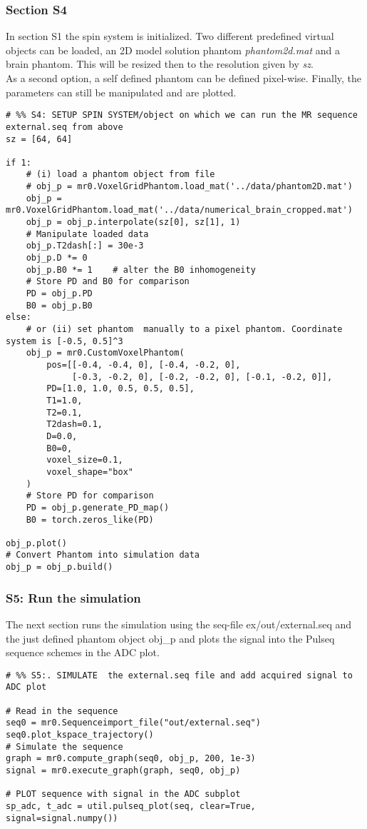 \documentclass[a4paper,12pt]{extarticle}
\begin{document}
\subsubsection{Section S4}
In section S1 the spin system is initialized. Two different predefined virtual objects can be loaded, an 2D model solution phantom \emph{phantom2d.mat} and a brain phantom. This will be resized then to the resolution given by \emph{sz}.  \\
As a second option, a self defined phantom can be defined pixel-wise.
Finally, the parameters can still be manipulated and are plotted.

\begin{verbatim}
# %% S4: SETUP SPIN SYSTEM/object on which we can run the MR sequence external.seq from above
sz = [64, 64]

if 1:
    # (i) load a phantom object from file
    # obj_p = mr0.VoxelGridPhantom.load_mat('../data/phantom2D.mat')
    obj_p = mr0.VoxelGridPhantom.load_mat('../data/numerical_brain_cropped.mat')
    obj_p = obj_p.interpolate(sz[0], sz[1], 1)
    # Manipulate loaded data
    obj_p.T2dash[:] = 30e-3
    obj_p.D *= 0 
    obj_p.B0 *= 1    # alter the B0 inhomogeneity
    # Store PD and B0 for comparison
    PD = obj_p.PD
    B0 = obj_p.B0
else:
    # or (ii) set phantom  manually to a pixel phantom. Coordinate system is [-0.5, 0.5]^3
    obj_p = mr0.CustomVoxelPhantom(
        pos=[[-0.4, -0.4, 0], [-0.4, -0.2, 0],
             [-0.3, -0.2, 0], [-0.2, -0.2, 0], [-0.1, -0.2, 0]],
        PD=[1.0, 1.0, 0.5, 0.5, 0.5],
        T1=1.0,
        T2=0.1,
        T2dash=0.1,
        D=0.0,
        B0=0,
        voxel_size=0.1,
        voxel_shape="box"
    )
    # Store PD for comparison
    PD = obj_p.generate_PD_map()
    B0 = torch.zeros_like(PD)

obj_p.plot()
# Convert Phantom into simulation data
obj_p = obj_p.build()

\end{verbatim}

\subsubsection{S5: Run the simulation}
The next section runs the simulation using the seq-file ex/out/external.seq and  the just defined phantom object obj\_p and plots the signal into the Pulseq sequence schemes in the ADC plot.

\begin{verbatim}
# %% S5:. SIMULATE  the external.seq file and add acquired signal to ADC plot

# Read in the sequence
seq0 = mr0.Sequenceimport_file("out/external.seq")
seq0.plot_kspace_trajectory()
# Simulate the sequence
graph = mr0.compute_graph(seq0, obj_p, 200, 1e-3)
signal = mr0.execute_graph(graph, seq0, obj_p)

# PLOT sequence with signal in the ADC subplot
sp_adc, t_adc = util.pulseq_plot(seq, clear=True, signal=signal.numpy())
\end{verbatim}
\end{document}
